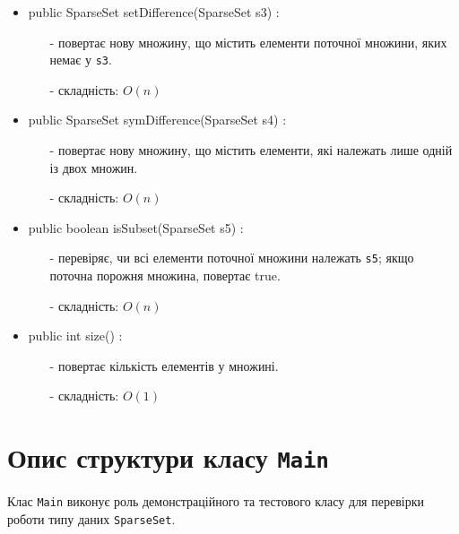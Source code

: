 \documentclass[12pt,a4paper]{article}
\begin{document}
\begin{itemize}
    \item public SparseSet setDifference(SparseSet s3) :
    \begin{itemize}
        \item[-] повертає нову множину, що містить елементи поточної множини, яких немає у \texttt{s3}.
        \item[-] складність: $O(n)$
    \end{itemize}

    \item public SparseSet symDifference(SparseSet s4) :
    \begin{itemize}
        \item[-] повертає нову множину, що містить елементи, які належать лише одній із двох множин.
        \item[-] складність: $O(n )$
    \end{itemize}

    \item public boolean isSubset(SparseSet s5) :
    \begin{itemize}
        \item[-] перевіряє, чи всі елементи поточної множини належать \texttt{s5}; якщо поточна порожня множина, повертає true.
        \item[-] складність: $O(n)$
    \end{itemize}

    \item public int size() :
    \begin{itemize}
        \item[-] повертає кількість елементів у множині.
        \item[-] складність: $O(1)$
    \end{itemize}

\end{itemize}

\section{Опис структури класу \texttt{Main}}
Клас \texttt{Main} виконує роль демонстраційного та тестового класу для перевірки роботи типу даних \texttt{SparseSet}.
\end{document}
